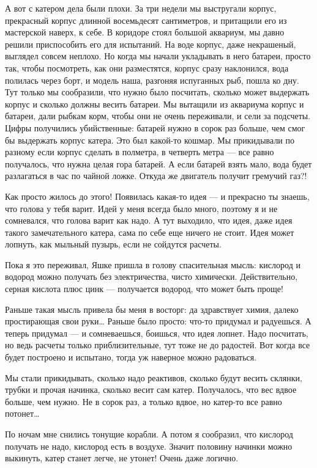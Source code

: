 А вот  с катером  дела были  плохи. За  три недели  мы выстругали  корпус,
прекрасный корпус  длинной восемьдесят  сантиметров,  и притащили  его  из
мастерской наверх, к  себе. В  коридоре стоял большой  аквариум, мы  давно
решили приспособить его  для испытаний. На  воде корпус, даже  некрашеный,
выглядел совсем неплохо.  Но когда  мы начали укладывать  в него  батареи,
просто  так,  чтобы   посмотреть,  как  они   разместятся,  корпус   сразу
наклонился, вода полилась через борт,  и модель наша, разгоняя  испуганных
рыб, пошла ко  дну. Тут только  мы сообразили, что  нужно было  посчитать,
сколько может  выдержать  корпус  и  сколько  должны  весить  батареи.  Мы
вытащили из аквариума  корпус и батареи,  дали рыбкам корм,  чтобы они  не
очень переживали,  и  сели  за подсчеты.  Цифры  получились  убийственные:
батарей нужно в сорок раз больше, чем смог бы выдержать корпус катера. Это
был какой-то  кошмар. Мы  прикидывали  по разному  если корпус  сделать  в
полметра, в четверть метра  — все равно получалось,  что нужна целая  гора
батарей. А если батарей взять мало, вода будет разлагаться в час по чайной
ложке. Откуда же двигатель получит гремучий газ?!

Как просто  жилось до  этого! Появилась  какая-то идея  — и  прекрасно  ты
знаешь, что голова у тебя варит. Идей у меня всегда было много, поэтому  я
и не сомневался, что голова варит как надо. А тут выходило, что идея, даже
идея такого замечательного катера, сама по себе еще ничего не стоит.  Идея
может лопнуть, как мыльный пузырь, если не сойдутся расчеты.

Пока я это переживал, Яшке пришла  в голову спасительная мысль: кислород  и
водород можно получать без электричества, чисто химически.  Действительно,
серная кислота плюс цинк — получается водород, что может быть проще!

Раньше такая мысль привела бы меня в восторг: да здравствует химия, далеко
простирающая свои руки… Раньше было просто: что-то придумал и радуешься. А
теперь  придумал  —  и  сомневаешься,  боишься,  что  идея  лопнет.   Надо
посчитать,  но  ведь  расчеты  только  приблизительные,  тут  тоже  не  до
радостей. Вот  когда все  будет построено  и испытано,  тогда уж  наверное
можно радоваться.

Мы  стали  прикидывать,  сколько  надо  реактивов,  сколько  будут  весить
склянки, трубки и прочая начинка, сколько весит сам катер. Получалось, что
вес вдвое больше, чем нужно. Не в  сорок раз, а только вдвое, но  катер-то
все равно потонет…

По ночам мне снились  тонущие корабли. А потом  я сообразил, что  кислород
получать не надо, кислород есть  в воздухе. Значит половину начинки  можно
выкинуть, катер станет легче, не утонет! Очень даже логично.

